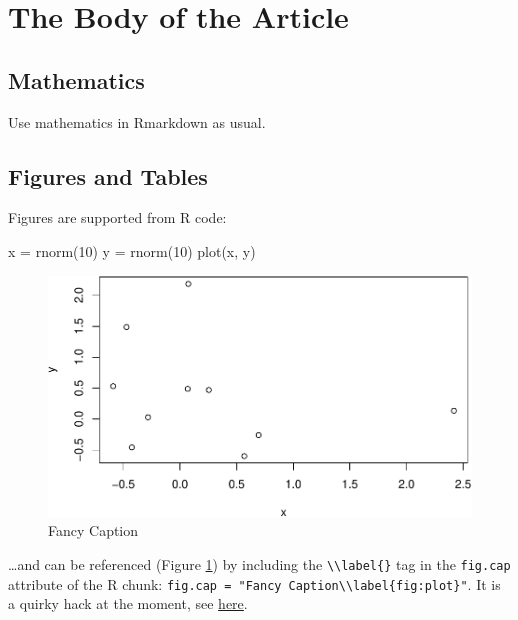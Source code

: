 \documentclass[AMA,STIX1COL,]{WileyNJD-v2}
\newenvironment{Shaded}{\begin{snugshade}}{\end{snugshade}}
\newcommand{\DecValTok}[1]{\textcolor[rgb]{0.00,0.00,0.81}{#1}}
\newcommand{\FunctionTok}[1]{\textcolor[rgb]{0.00,0.00,0.00}{#1}}
\newcommand{\NormalTok}[1]{#1}
\newcommand{\OtherTok}[1]{\textcolor[rgb]{0.56,0.35,0.01}{#1}}
\begin{document}
\hypertarget{the-body-of-the-article}{%
\section{The Body of the Article}\label{the-body-of-the-article}}

\hypertarget{mathematics}{%
\subsection{Mathematics}\label{mathematics}}

Use mathematics in Rmarkdown as usual.

\hypertarget{figures-and-tables}{%
\subsection{Figures and Tables}\label{figures-and-tables}}

Figures are supported from R code:

\begin{Shaded}
\begin{Highlighting}[]
\NormalTok{x }\OtherTok{=} \FunctionTok{rnorm}\NormalTok{(}\DecValTok{10}\NormalTok{)}
\NormalTok{y }\OtherTok{=} \FunctionTok{rnorm}\NormalTok{(}\DecValTok{10}\NormalTok{)}
\FunctionTok{plot}\NormalTok{(x, y)}
\end{Highlighting}
\end{Shaded}

\begin{figure}
\centering
\includegraphics{article_files/figure-latex/plot-ref-1.pdf}
\caption{Fancy Caption\label{fig:plot}}
\end{figure}

\ldots and can be referenced (Figure \ref{fig:plot}) by including the
\texttt{\textbackslash{}\textbackslash{}label\{\}} tag in the
\texttt{fig.cap} attribute of the R chunk:
\texttt{fig.cap\ =\ "Fancy\ Caption\textbackslash{}\textbackslash{}label\{fig:plot\}"}.
It is a quirky hack at the moment, see
\href{https://github.com/yihui/knitr/issues/323}{here}.
\end{document}
